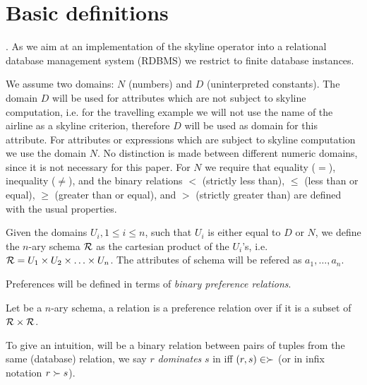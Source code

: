 \clearpage 
{}
\section{Basic definitions}
. As we aim at an implementation of the skyline operator into a relational database management system (RDBMS) we restrict to finite database instances.

We assume two  domains: $N$ (numbers) and $D$ (uninterpreted constants). The domain $D$ will be used for attributes which are not subject to skyline computation, i.e. for the travelling example we will not use the name of the airline as a skyline criterion, therefore $D$ will be used as domain for this attribute.
For attributes or expressions which are subject to skyline computation we use the domain $N$. No distinction is made between different numeric domains, since it is not necessary for this paper. For $N$ we require that equality ($=$), inequality ($\not=$), and the binary relations $<$ (strictly less than), $\le$ (less than or equal), $\ge$ (greater than or equal), and $>$ (strictly greater than) are defined with the usual properties.

\begin{definition}[Schema]
Given the domains $U_i, 1 \le i \le n$, such that $U_i$ is either equal to $D$ or $N$, we define the $n$-ary schema $\mathcal{R}$ as the cartesian product of the $U_i$'s, i.e. $\mathcal{R} = U_1 \times U_2 \times \ldots \times U_n$. The attributes of schema  will be refered as $a_1, \ldots, a_n$.
\end{definition}

Preferences will be defined in terms of \emph{binary preference relations}.
\begin{definition}
Let  be a $n$-ary schema, a relation \dominates is a preference relation over  if it is a subset of $\mathcal{R} \times \mathcal{R}$.
\end{definition}

To give an intuition, \dominates will be a binary relation between pairs of tuples from the same (database) relation, we say $r$ \emph{dominates} $s$ in \dominates iff $(r, s) \in \succ$ (or in infix notation $r \succ s$).

